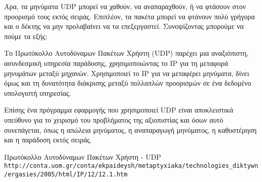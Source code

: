 \documentclass{article}
\begin{document}
Άρα, τα μηνύματα UDP μπορεί να χαθούν, να αναπαραχθούν, ή να φτάσουν στον
προορισμό τους εκτός σειράς. Επιπλέον, τα πακέτα μπορεί να φτάνουν πολύ γρήγορα
και ο δέκτης να μην προλαβαίνει να τα επεξεργαστεί. Συνοψίζοντας μπορούμε να
πούμε τα εξής:

Το Πρωτόκολλο Αυτοδύναμων Πακέτων Χρήστη (UDP) παρέχει μια αναξιόπιστη,
ασυνδεσμική υπηρεσία παράδοσης, χρησιμοποιώντας το ΙΡ για τη μεταφορά μηνυμάτων
μεταξύ μηχανών. Χρησιμοποιεί το ΙΡ για να μεταφέρει μηνύματα, δίνει όμως και τη
δυνατότητα διάκρισης μεταξύ πολλαπλών προορισμών σε ένα δεδομένο υπολογιστή
υπηρεσίας.

Επίσης ένα πρόγραμμα εφαρμογής που χρησιμοποιεί UDP είναι αποκλειστικά υπεύθυνο για το
χειρισμό του προβλήματος της αξιοπιστίας και όσων αυτό συνεπάγεται, όπως η
απώλεια μηνύματος, η αναπαραγωγή μηνύματος, η καθυστέρηση και η παράδοση εκτός
σειράς.

\begin{thebibliography}{9}

Πρωτόκολλο Αυτοδύναμων Πακέτων Χρήστη - UDP
\\\texttt{http://conta.uom.gr/conta/ekpaideysh/metaptyxiaka/technologies\_diktywn
/ergasies/2005/html/IP/12/12.1.htm}
\end{thebibliography}
\end{document}
